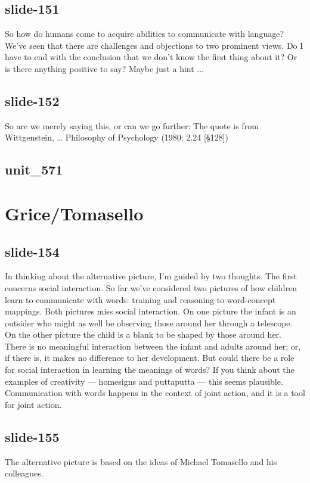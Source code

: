 \documentclass[12pt,\papersize]{extarticle}
\begin{document}
 
\subsection{slide-151}
So how do humans come to acquire abilities to communicate with language?
We've seen that there are challenges and objections to two prominent views.
Do I have to end with the conclusion that we don't know the first thing about it?
Or is there anything positive to say?
Maybe just a hint ...
 
 
\subsection{slide-152}
So are we merely saying this, or can we go further:
The quote is from Wittgenstein, … Philosophy of Psychology (1980: 2.24 [§128])
 
 
\subsection{unit\_571}
 
\section{Grice/Tomasello}
 
 
\subsection{slide-154}
In thinking about the alternative picture, I'm guided by two thoughts.
The first concerns social interaction.
So far we've considered two pictures of how children learn to communicate with words: training and reasoning to word-concept mappings.
Both pictures miss social interaction.
On one picture the infant is an outsider who might as well be observing those around her through a telescope.
On the other picture the child is a blank to be shaped by those around her.
There is no meaningful interaction between the infant and adults around her; or, if there is, it makes no difference to her development.
But could there be a role for social interaction in learning the meanings of words?
If you think about the examples of creativity --- homesigns and puttaputta --- this seems plausible.
Communication with words happens in the context of joint action, and it is a tool for joint action.
 
 
\subsection{slide-155}
The alternative picture is based on the ideas of Michael Tomasello and his colleagues.
 
\end{document}
